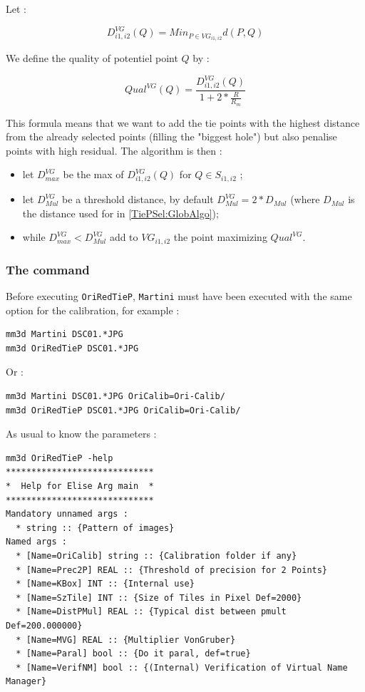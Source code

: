 Let :

\begin{equation}
 D^{VG}_{i1,i2}(Q)  = Min_{P \in VG_{i1,i2}} d(P,Q)
\end{equation}

We define the quality of potentiel point $Q$ by :


\begin{equation}
  Qual^{VG}(Q)  = \frac{D^{VG}_{i1,i2}(Q)}{1+2*\frac{R}{R_m}}
\end{equation}

This formula means that we want to add the tie points with the highest distance
from the already selected points (filling the "biggest hole") but also penalise points with high residual. The algorithm
is then :

\begin{itemize}
    \item let $D^{VG}_{max}$ be the max of $D^{VG}_{i1,i2}(Q)$ for $Q\in S_{i1,i2}$ ;
    \item let $D^{VG}_{Mul}$ be a threshold distance, by default $D^{VG}_{Mul} = 2 * D_{Mul}$
          (where $ D_{Mul}$ is the distance used for in \ref{TiePSel:GlobAlgo});

    \item while  $D^{VG}_{max} < D^{VG}_{Mul}$  add to  $VG_{i1,i2}$ the point maximizing $ Qual^{VG}$.
\end{itemize}


\subsubsection{The command}

Before executing {\tt OriRedTieP}, {\tt Martini} must have been executed with the same option for the
calibration, for example :


\begin{verbatim}
mm3d Martini DSC01.*JPG
mm3d OriRedTieP DSC01.*JPG
\end{verbatim}

Or :

\begin{verbatim}
mm3d Martini DSC01.*JPG OriCalib=Ori-Calib/
mm3d OriRedTieP DSC01.*JPG OriCalib=Ori-Calib/
\end{verbatim}

As usual to know the parameters :


\begin{verbatim}
mm3d OriRedTieP -help
*****************************
*  Help for Elise Arg main  *
*****************************
Mandatory unnamed args : 
  * string :: {Pattern of images}
Named args : 
  * [Name=OriCalib] string :: {Calibration folder if any}
  * [Name=Prec2P] REAL :: {Threshold of precision for 2 Points}
  * [Name=KBox] INT :: {Internal use}
  * [Name=SzTile] INT :: {Size of Tiles in Pixel Def=2000}
  * [Name=DistPMul] REAL :: {Typical dist between pmult Def=200.000000}
  * [Name=MVG] REAL :: {Multiplier VonGruber}
  * [Name=Paral] bool :: {Do it paral, def=true}
  * [Name=VerifNM] bool :: {(Internal) Verification of Virtual Name Manager}
\end{verbatim}

